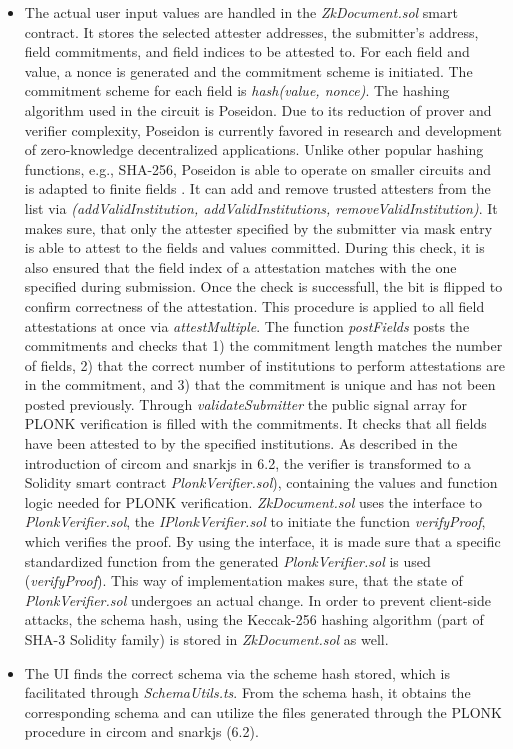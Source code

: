 \begin{itemize}
\item The actual user input values are handled in the \textit{ZkDocument.sol} smart contract. It stores the selected attester addresses, the submitter's address, field commitments, and field indices to be attested to. For each field and value, a nonce is generated and the commitment scheme is initiated. The commitment scheme for each field is \textit{hash(value, nonce)}. The hashing algorithm used in the circuit is Poseidon. Due to its reduction of prover and verifier complexity, Poseidon is currently favored in research and development of zero-knowledge decentralized applications. Unlike other popular hashing functions, e.g., SHA-256, Poseidon is able to operate on smaller circuits and is adapted to finite fields \citep{poseidon}. It can add and remove trusted attesters from the list via \textit{(addValidInstitution, addValidInstitutions, removeValidInstitution)}. It makes sure, that only the attester specified by the submitter via mask entry is able to attest to the fields and values committed. During this check, it is also ensured that the field index of a attestation matches with the one specified during submission. Once the check is successfull, the bit is flipped to confirm correctness of the attestation. This procedure is applied to all field attestations at once via \textit{attestMultiple}. The function \textit{postFields} posts the commitments and checks that 1) the commitment length matches the number of fields, 2) that the correct number of institutions to perform attestations are in the commitment, and 3) that the commitment is unique and has not been posted previously. Through \textit{validateSubmitter} the public signal array for PLONK verification is filled with the commitments. It checks that all fields have been attested to by the specified institutions. As described in the introduction of circom and snarkjs in 6.2, the verifier is transformed to a Solidity smart contract \textit{PlonkVerifier.sol}), containing the values and function logic needed for PLONK verification. \textit{ZkDocument.sol} uses the interface to \textit{PlonkVerifier.sol}, the \textit{IPlonkVerifier.sol} to initiate the function \textit{verifyProof}, which verifies the proof. By using the interface, it is made sure that a specific standardized function from the generated \textit{PlonkVerifier.sol} is used (\textit{verifyProof}). This way of implementation makes sure, that the state of \textit{PlonkVerifier.sol} undergoes an actual change. In order to prevent client-side attacks, the schema hash, using the Keccak-256 hashing algorithm (part of SHA-3 Solidity family) is stored in \textit{ZkDocument.sol} as well. 

\item The UI finds the correct schema via the scheme hash stored, which is facilitated through \textit{SchemaUtils.ts}. From the schema hash, it obtains the corresponding schema and can utilize the files generated through the PLONK procedure in circom and snarkjs (6.2).
\end{itemize}
